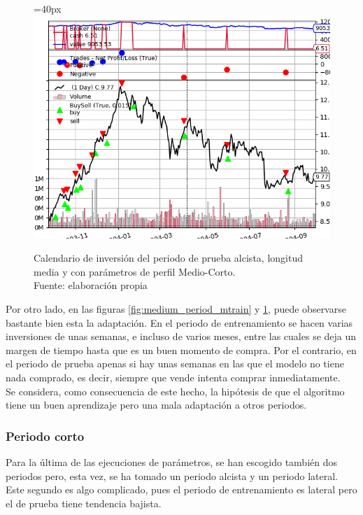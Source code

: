      	\begin{figure}[H]
     		\centering\leftskip=40px
     		\includegraphics[scale=0.66]{imagenes/M_Large-Medium_test.png}
     		\caption[Calendario de inversi\'on del periodo de prueba medio]{Calendario de inversi\'on del periodo de prueba alcista, longitud media y con par\'ametros de perfil Medio-Corto.\\ Fuente: elaboraci\'on propia}
     		\label{fig:medium_period_mtest}
     	\end{figure} 

Por otro lado, en las figuras \ref{fig:medium_period_mtrain} y \ref{fig:medium_period_mtest}, puede observarse bastante bien esta la adaptaci\'on. En el periodo de entrenamiento se hacen varias inversiones de unas semanas, e incluso de varios meses, entre las cuales se deja un margen de tiempo hasta que es un buen momento de compra. Por el contrario, en el periodo de prueba apenas si hay unas semanas en las que el modelo no tiene nada comprado, es decir, siempre que vende intenta comprar inmediatamente.\\

Se considera, como consecuencia de este hecho, la hip\'otesis de que el algoritmo tiene un buen aprendizaje pero una mala adaptaci\'on a otros periodos.\\

     	
\subsubsection{Periodo corto}

Para la \'ultima de las ejecuciones de par\'ametros, se han escogido tambi\'en dos periodos pero, esta vez, se ha tomado un periodo alcista y un periodo lateral. Este segundo es algo complicado, pues el periodo de entrenamiento es lateral pero el de prueba tiene tendencia bajista. \\

